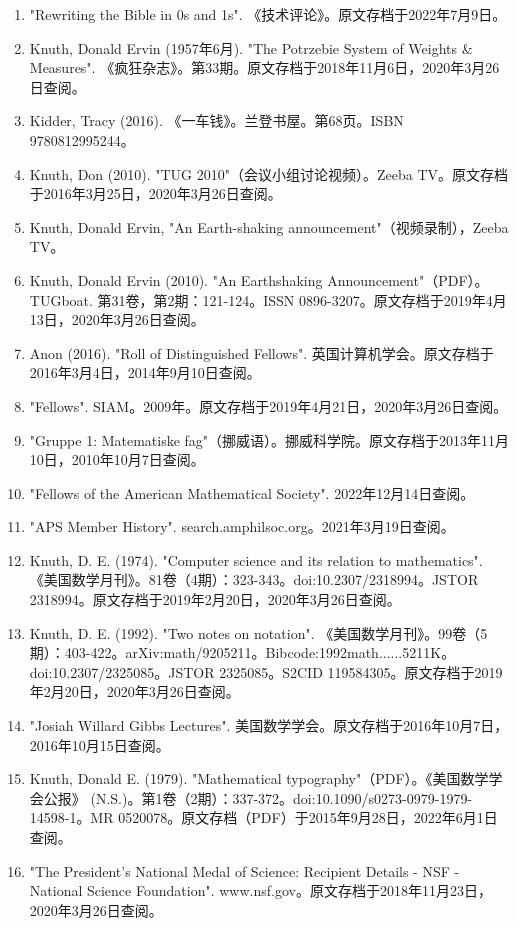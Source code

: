 \begin{enumerate}
\item "Rewriting the Bible in 0s and 1s". 《技术评论》。原文存档于2022年7月9日。
\item Knuth, Donald Ervin (1957年6月). "The Potrzebie System of Weights & Measures". 《疯狂杂志》。第33期。原文存档于2018年11月6日，2020年3月26日查阅。
\item Kidder, Tracy (2016). 《一车钱》。兰登书屋。第68页。ISBN 9780812995244。
\item Knuth, Don (2010). "TUG 2010"（会议小组讨论视频）。Zeeba TV。原文存档于2016年3月25日，2020年3月26日查阅。
\item Knuth, Donald Ervin, "An Earth-shaking announcement"（视频录制），Zeeba TV。
\item Knuth, Donald Ervin (2010). "An Earthshaking Announcement"（PDF）。TUGboat. 第31卷，第2期：121-124。ISSN 0896-3207。原文存档于2019年4月13日，2020年3月26日查阅。
\item Anon (2016). "Roll of Distinguished Fellows". 英国计算机学会。原文存档于2016年3月4日，2014年9月10日查阅。
\item "Fellows". SIAM。2009年。原文存档于2019年4月21日，2020年3月26日查阅。
\item "Gruppe 1: Matematiske fag"（挪威语）。挪威科学院。原文存档于2013年11月10日，2010年10月7日查阅。
\item "Fellows of the American Mathematical Society". 2022年12月14日查阅。
\item "APS Member History". search.amphilsoc.org。2021年3月19日查阅。
\item Knuth, D. E. (1974). "Computer science and its relation to mathematics". 《美国数学月刊》。81卷（4期）：323-343。doi:10.2307/2318994。JSTOR 2318994。原文存档于2019年2月20日，2020年3月26日查阅。
\item Knuth, D. E. (1992). "Two notes on notation". 《美国数学月刊》。99卷（5期）：403-422。arXiv:math/9205211。Bibcode:1992math......5211K。doi:10.2307/2325085。JSTOR 2325085。S2CID 119584305。原文存档于2019年2月20日，2020年3月26日查阅。
\item "Josiah Willard Gibbs Lectures". 美国数学学会。原文存档于2016年10月7日，2016年10月15日查阅。
\item Knuth, Donald E. (1979). "Mathematical typography"（PDF）。《美国数学学会公报》 (N.S.)。第1卷（2期）：337-372。doi:10.1090/s0273-0979-1979-14598-1。MR 0520078。原文存档（PDF）于2015年9月28日，2022年6月1日查阅。
\item "The President's National Medal of Science: Recipient Details - NSF - National Science Foundation". www.nsf.gov。原文存档于2018年11月23日，2020年3月26日查阅。

\end{enumerate}

